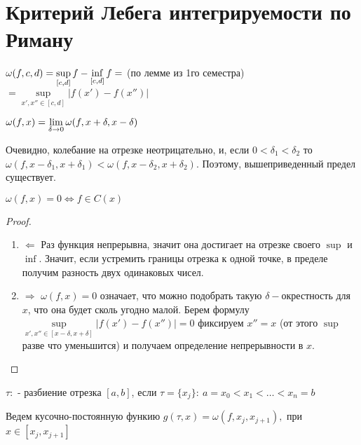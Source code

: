 \section{Критерий Лебега интегрируемости по Риману}

\begin{definition}
$\\ \omega(f, c, d) = \sup\limits_{[c, d]} f - \inf\limits_{[c, d]} f = $ (по лемме из 1го семестра) $ = \sup\limits_{x',x'' \in [c,d]} | f(x') - f(x'') |$
\end{definition}

\begin{definition}
$\\ \omega(f, x) = \lim\limits_{\delta \rightarrow 0} \omega(f, x + \delta, x - \delta)$
\end{definition}

Очевидно, колебание на отрезке неотрицательно, и, если $0 < \delta_1 < \delta_2$ то $\omega(f, x - \delta_1, x + \delta_1) < \omega(f, x - \delta_2, x + \delta_2)$.
Поэтому, вышеприведенный предел существует.

\begin{statement}
$\omega(f, x) = 0 \Leftrightarrow f \in C(x)$
\end{statement}

\begin{proof}
	\begin{enumerate}
		\item $\Leftarrow$ Раз функция непрерывна, значит она достигает на отрезке своего $\sup$ и $\inf$. Значит, если устремить границы отрезка к одной точке, в пределе получим разность двух одинаковых чисел.
		\item $\Rightarrow$ $\omega(f, x) = 0$ означает, что можно подобрать такую $\delta-$окрестность для $x$, что она будет сколь угодно малой. Берем формулу $\sup\limits_{x',x'' \in [x - \delta,x + \delta]} | f(x') - f(x'') | = 0$ фиксируем $x'' = x$ (от этого $\sup$ разве что уменьшится) и получаем определение непрерывности в $x$.
	\end{enumerate}
\end{proof}

\begin{definition}
$\tau:$ - разбиение отрезка $[a, b]$, если $\tau = \{x_j\}: \: a = x_0 < x_1 < \dots < x_n = b$
\end{definition}

Ведем кусочно-постоянную функию $g(\tau, x) = \omega(f, x_j, x_{j + 1}),$ при $x \in [x_j, x_{j + 1}]$

